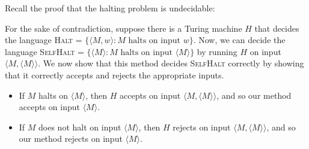\documentclass[11pt]{article}
\begin{document}

Recall the proof that the halting problem is undecidable:

\begin{Solution}
   For the sake of contradiction, suppose there is a Turing machine $H$
   that decides the language \textsc{Halt} = $\{\langle M,w \rangle : M \text{ halts on input } w\}$.
   Now, we can decide the language \textsc{SelfHalt} = $\{\langle M \rangle : M
   \text{ halts on input } \langle M \rangle\}$ by running $H$ on input $\langle
   M, \langle M \rangle \rangle$. We now show that this method decides
   \textsc{SelfHalt} correctly by showing that it correctly accepts and rejects the appropriate inputs.

   \begin{itemize}
    \item If $M$ halts on $\langle M \rangle$, then $H$ accepts on input $\langle M, \langle M
    \rangle \rangle$, and so our method accepts on input $\langle M \rangle$.

    \item If $M$ does not halt on input $\langle M \rangle$, then $H$ rejects on
    input $\langle M, \langle M \rangle \rangle$, and so our method rejects on
    input $\langle M \rangle$.
   \end{itemize}

   




\end{Solution}
\end{document}
